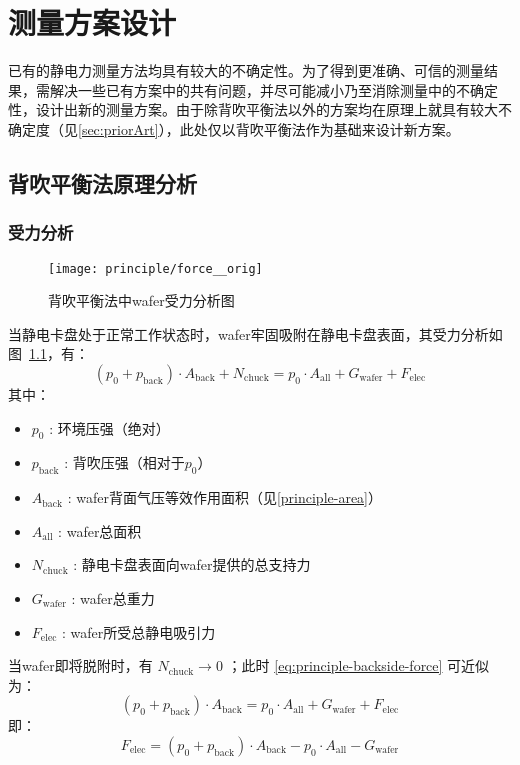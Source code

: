 \chapter{测量方案设计}\label{ch:principle}

已有的静电力测量方法均具有较大的不确定性。为了得到更准确、可信的测量结果，需解决一些已有方案中的共有问题，并尽可能减小乃至消除测量中的不确定性，设计出新的测量方案。由于除背吹平衡法以外的方案均在原理上就具有较大不确定度（见\ref{sec:priorArt}），此处仅以背吹平衡法作为基础来设计新方案。



\section[背吹法原理分析]{背吹平衡法原理分析}\label{sec:principle-backside}


\subsection{受力分析}\label{sec:principle-backside-force}

\begin{figure}[hbt]
\centering
\texttt{[image: principle/force\_\_orig]}
\caption[背吹平衡法wafer受力]{背吹平衡法中wafer受力分析图}
\label{fig:principle-backside-force}
\end{figure}

当静电卡盘处于正常工作状态时，wafer牢固吸附在静电卡盘表面，其受力分析如图~\ref{fig:principle-backside-force}，有：
\begin{equation}
\label{eq:principle-backside-force}
(p_{0} + p_{\mathrm{back}}) \cdot A_{\mathrm{back}} + N_{\mathrm{chuck}} = p_0 \cdot A_{\mathrm{all}} + G_{\mathrm{wafer}} + F_{\mathrm{elec}}
\end{equation}
其中：
\begin{itemize}
  \item $p_{0}$ : 环境压强（绝对）
  \item $p_{\mathrm{back}}$  : 背吹压强（相对于$p_{0}$）
  \item $A_{\mathrm{back}}$  : wafer背面气压等效作用面积（见\ref{principle-area}）
  \item $A_{\mathrm{all}}$   : wafer总面积
  \item $N_{\mathrm{chuck}}$ : 静电卡盘表面向wafer提供的总支持力
  \item $G_{\mathrm{wafer}}$ : wafer总重力
  \item $F_{\mathrm{elec}}$  : wafer所受总静电吸引力
\end{itemize}
当wafer即将脱附时，有 $N_{\mathrm{chuck}} \to 0$ ；此时 \eqref{eq:principle-backside-force} 可近似为：
\begin{equation*}
\label{eq:principle-backside-force'}
(p_{0} + p_{\mathrm{back}}) \cdot A_{\mathrm{back}} = p_0 \cdot A_{\mathrm{all}} + G_{\mathrm{wafer}} + F_{\mathrm{elec}}
\end{equation*}
即：
\begin{equation}
\label{eq:principle-backside-force''}
F_{\mathrm{elec}} = (p_{0} + p_{\mathrm{back}}) \cdot A_{\mathrm{back}} - p_0 \cdot A_{\mathrm{all}} - G_{\mathrm{wafer}}
\end{equation}


